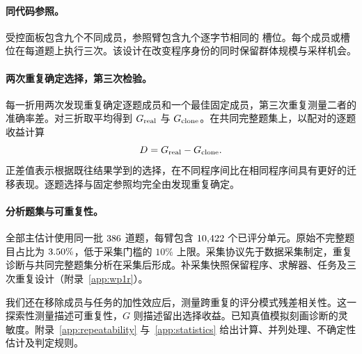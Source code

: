 \paragraph{同代码参照。}
受控面板包含九个不同成员，参照臂包含九个逐字节相同的 \bare{} 槽位。每个成员或槽位在每道题上执行三次。该设计在改变程序身份的同时保留群体规模与采样机会。

\paragraph{两次重复确定选择，第三次检验。}
\label{sec:calibration-test}
每一折用两次发现重复确定逐题成员和一个最佳固定成员，第三次重复测量二者的准确率差。对三折取平均得到 $G_{\rm real}$ 与 $G_{\rm clone}$。在共同完整题集上，以配对的逐题收益计算
\begin{equation}
D=G_{\rm real}-G_{\rm clone}.
\label{eq:clone-difference}
\end{equation}
正差值表示根据既往结果学到的选择，在不同程序间比在相同程序间具有更好的迁移表现。逐题选择与固定参照均完全由发现重复确定。

\paragraph{分析题集与可重复性。}
全部主估计使用同一批 $386$ 道题，每臂包含 $10{,}422$ 个已评分单元。原始不完整题目占比为 $3.50\%$，低于采集门槛的 $10\%$ 上限。采集协议先于数据采集制定，重复诊断与共同完整题集分析在采集后形成。补采集快照保留程序、求解器、任务及三次重复设计（附录~\ref{app:wp1r}）。

我们还在移除成员与任务的加性效应后，测量跨重复的评分模式残差相关性。这一探索性测量描述可重复性，$G$ 则描述留出选择收益。已知真值模拟刻画诊断的灵敏度。附录~\ref{app:repeatability} 与~\ref{app:statistics} 给出计算、并列处理、不确定性估计及判定规则。
